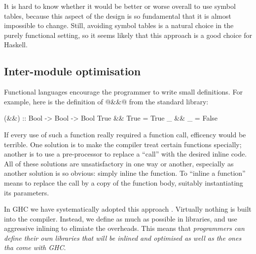 \documentclass{article}
\let\cite=\citep
\begin{document}
It is hard to know whether it would be better or worse overall to use
symbol tables, because this aspect of the design is so fundamental
that it is almost impossible to change.  Still, avoiding symbol tables
is a natural choice in the purely functional setting, so it seems
likely that this approach is a good choice for Haskell.


\subsection{Inter-module optimisation}

Functional languages encourage the programmer to write small definitions.
For example, here is the definition of @&&@ from the standard library:
\begin{code}
(&&) :: Bool -> Bool -> Bool
True && True = True
_    && _    = False
\end{code}
If every use of such a function really required a function call, efficency
would be terrible.  One solution is to make the compiler treat certain
functions specially; another is to use a pre-processor to replace a ``call''
with the desired inline code.  All of these solutions are unsatisfactory in
one way or another, especially as another solution is so obvious: simply
inline the function.  To ``inline a function'' means to replace the call
by a copy of the function body, suitably instantiating its parameters.

In GHC we have systematically adopted this approach \cite{inlining}.
Virtually nothing is built into the compiler.  Instead, we define as
much as possible in libraries, and use aggressive inlining to elimiate
the overheads.  This means that \emph{programmers can define their own
  libraries that will be inlined and optimised as well as the ones tha
  come with GHC}.
\end{document}
